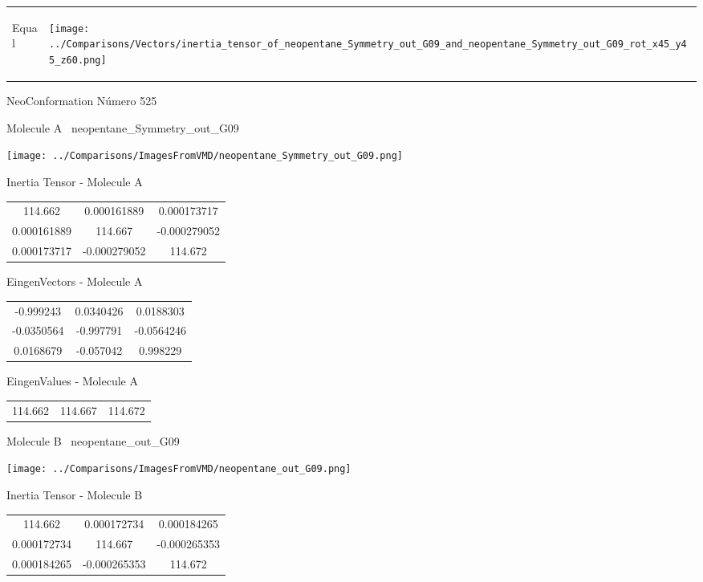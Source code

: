 \vtab[-5mm]
\begin{tabular}{*{2}{m{}}}
\begin{center}
\textcolor{NavyBlue}{\Large Equal}
\end{center}
&
\begin{center}
\texttt{[image: ../Comparisons/Vectors/inertia\_tensor\_of\_neopentane\_Symmetry\_out\_G09\_and\_neopentane\_Symmetry\_out\_G09\_rot\_x45\_y45\_z60.png]}
\end{center}
\end{tabular}

 \newpage

\vtab[-3cm]
\begin{center}
{\large NeoConformation \tab Número 525}
\end{center}
\begin{multicols}{2}
\begin{center}

Molecule A \
neopentane\_Symmetry\_out\_G09

\texttt{[image: ../Comparisons/ImagesFromVMD/neopentane\_Symmetry\_out\_G09.png]}

Inertia Tensor - Molecule A \\
\begin{tabular}{|c c c|}
114.662	 & 	0.000161889	 & 	0.000173717	 \\
0.000161889	 & 	114.667	 & 	-0.000279052	 \\
0.000173717	 & 	-0.000279052	 & 	114.672
\end{tabular}

\vtab
 EingenVectors - Molecule A     \\
\begin{tabular}{|c c c|}
-0.999243	 & 	0.0340426	 & 	0.0188303	 \\
-0.0350564	 & 	-0.997791	 & 	-0.0564246	 \\
0.0168679	 & 	-0.057042	 & 	0.998229
\end{tabular}

\vtab
 EingenValues - Molecule A     \\
\begin{tabular}{|c c c|}
114.662	 & 	114.667	 & 	114.672	 \\
\end{tabular}
\columnbreak

Molecule B \
neopentane\_out\_G09

\texttt{[image: ../Comparisons/ImagesFromVMD/neopentane\_out\_G09.png]}

Inertia Tensor - Molecule B \\
\begin{tabular}{|c c c|}
114.662	 & 	0.000172734	 & 	0.000184265	 \\
0.000172734	 & 	114.667	 & 	-0.000265353	 \\
0.000184265	 & 	-0.000265353	 & 	114.672
\end{tabular}


\end{center}
\end{multicols}
